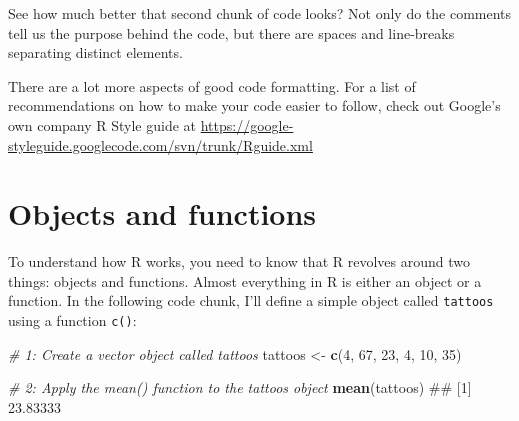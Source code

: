 \documentclass[]{book}
\newenvironment{Shaded}{\begin{snugshade}}{\end{snugshade}}
\newcommand{\KeywordTok}[1]{\textcolor[rgb]{0.13,0.29,0.53}{\textbf{#1}}}
\newcommand{\DataTypeTok}[1]{\textcolor[rgb]{0.13,0.29,0.53}{#1}}
\newcommand{\DecValTok}[1]{\textcolor[rgb]{0.00,0.00,0.81}{#1}}
\newcommand{\FloatTok}[1]{\textcolor[rgb]{0.00,0.00,0.81}{#1}}
\newcommand{\StringTok}[1]{\textcolor[rgb]{0.31,0.60,0.02}{#1}}
\newcommand{\CommentTok}[1]{\textcolor[rgb]{0.56,0.35,0.01}{\textit{#1}}}
\newcommand{\OperatorTok}[1]{\textcolor[rgb]{0.81,0.36,0.00}{\textbf{#1}}}
\newcommand{\NormalTok}[1]{#1}
\theoremstyle{definition}
\theoremstyle{definition}
\theoremstyle{remark}
\begin{document}
\begin{Shaded}
\end{Shaded}

See how much better that second chunk of code looks? Not only do the
comments tell us the purpose behind the code, but there are spaces and
line-breaks separating distinct elements.

There are a lot more aspects of good code formatting. For a list of
recommendations on how to make your code easier to follow, check out
Google's own company R Style guide at
\url{https://google-styleguide.googlecode.com/svn/trunk/Rguide.xml}

\section{Objects and functions}\label{objects-and-functions}

To understand how R works, you need to know that R revolves around two
things: objects and functions. Almost everything in R is either an
object or a function. In the following code chunk, I'll define a simple
object called \texttt{tattoos} using a function \texttt{c()}:

\begin{Shaded}
\begin{Highlighting}[]
\CommentTok{# 1: Create a vector object called tattoos}
\NormalTok{tattoos <-}\StringTok{ }\KeywordTok{c}\NormalTok{(}\DecValTok{4}\NormalTok{, }\DecValTok{67}\NormalTok{, }\DecValTok{23}\NormalTok{, }\DecValTok{4}\NormalTok{, }\DecValTok{10}\NormalTok{, }\DecValTok{35}\NormalTok{)}

\CommentTok{# 2: Apply the mean() function to the tattoos object}
\KeywordTok{mean}\NormalTok{(tattoos)}
\NormalTok{## [1] 23.83333}
\end{Highlighting}
\end{Shaded}
\end{document}
